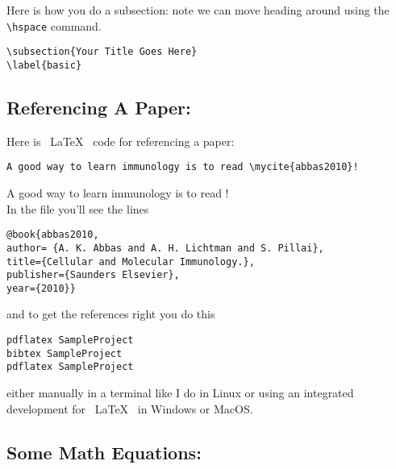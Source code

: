 \documentclass[11pt]{SelfArxOneColBMN}
\begin{document}
\noindent
Here is how you do a subsection: note we can move heading around using the
\verb+\hspace+ command.

\singlespacing 
{}
\begin{lstlisting}
\subsection{Your Title Goes Here}
\label{basic}
\end{lstlisting}
\onehalfspacing
\lstset{fancyvrb=false}

\subsection{Referencing A Paper:}

Here is ~\LaTeX~ code for referencing a paper:

\singlespacing 
{}
\begin{lstlisting}
A good way to learn immunology is to read \mycite{abbas2010}!
\end{lstlisting}
\onehalfspacing
\lstset{fancyvrb=false}

\noindent
A good way to learn immunology is to read !\\

\noindent
In the  file you'll see the lines

\singlespacing 
{}
\begin{lstlisting}
@book{abbas2010,
author= {A. K. Abbas and A. H. Lichtman and S. Pillai},
title={Cellular and Molecular Immunology.},
publisher={Saunders Elsevier}, 
year={2010}}
\end{lstlisting}
\onehalfspacing
\lstset{fancyvrb=false}

\noindent
and to get the references right you do this

\singlespacing 
{}
\begin{lstlisting}
pdflatex SampleProject
bibtex SampleProject
pdflatex SampleProject
\end{lstlisting}
\onehalfspacing
\lstset{fancyvrb=false}

\noindent
either manually in a terminal like I do in Linux or using an integrated development
for ~\LaTeX~ in Windows or MacOS.

\subsection{Some Math Equations:}
\end{document}

